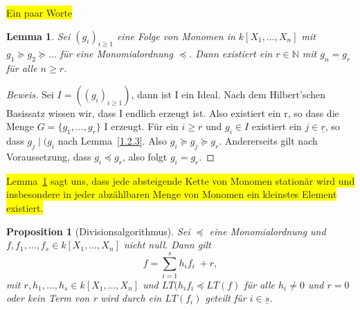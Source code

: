 \documentclass{article}
\newtheorem{lemma}[satz]{Lemma}
\newtheorem{proposition}[satz]{Proposition}
\newcommand*{\R}{k[X_{1},\ldots,X_{n}]}
\begin{document}
	
	\colorbox{yellow}{Ein paar Worte}


	\begin{lemma} \label{1.2.4}
	Sei \((g_{i})_{i \geq 1}\) eine Folge von Monomen in \(\R\) mit \(g_{1} \succeq g_{2} \succeq
	\ldots\) für eine Monomialordnung \(\preceq\). Dann existiert ein \(r \in \mathbb{N}\) mit 
	\(g_{n} = g_{r}\) für alle \(n \geq r\). 
	\end{lemma}

	\begin{proof}[Beweis]
	Sei \(I = ((g_{i})_{i \geq 1})\), dann ist I ein Ideal. Nach dem Hilbert'schen Basissatz
	wissen wir, dass I endlich erzeugt ist. Also existiert ein r, so dass die Menge \(G = \{g_{1},
	\ldots, g_{r}\}\) I erzeugt. Für ein \(i \geq r\) und \(g_{i} \in I\) existiert ein
	\(j \in \underline{r}\), so dass \(g_{j}\; | \;(g_{i}\) nach Lemma~\ref{1.2.3}. Also \(g_{i}
	\succeq g_{j} \succeq g_{r}\). Andererseits gilt nach Voraussetzung, dass \(g_{i} \preceq g_{r}
	\), also folgt \(g_{i} = g_{r}\).
	\end{proof}


	\colorbox{yellow}{Lemma~\ref{1.2.4} sagt uns, dass jede absteigende Kette von Monomen stationär wird und insbesondere in jeder abzählbaren Menge von Monomen ein kleinstes Element existiert.}
	

	\begin{proposition}[Divisionsalgorithmus] \label{1.2.5}
	Sei \(\preceq\) eine Monomialordnung und \(f, f_{1}, \ldots, f_{s} \in \R\) nicht null. Dann
	gilt \begin{displaymath} f = \sum_{i=1}^{s} h_{i}f_{i}\; + r, \end{displaymath} mit
	\(r, h_{1}, \ldots, h_{s} \in \R\) und \(LT(h_{i}f_{i} \preceq LT(f)\) für alle \(h_{i} \neq 0
	\) und \(r = 0\) oder kein Term von r wird durch ein \(LT(f_{i})\) geteilt für \(i \in
	\underline{s}\).
	\end{proposition}
\end{document}
